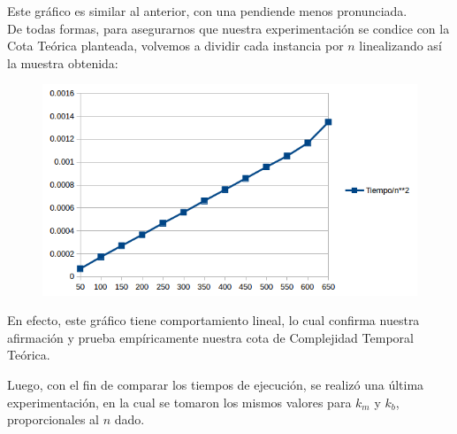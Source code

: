       \newpage
  
  Este gr\'afico es similar al anterior, con una pendiende menos pronunciada.\\
  
  De todas formas, para asegurarnos que nuestra experimentaci\'on se condice con la Cota Te\'orica planteada, volvemos a dividir cada instancia por $n$ linealizando as\'i la muestra obtenida:\\
  
    \begin{figure}[h!]
   \begin{center}
	\includegraphics[scale=0.8]{imagenes/ej1/peorCaso3.png}
   \end{center}
  \end{figure}
  
  En efecto, este gr\'afico tiene comportamiento lineal, lo cual confirma nuestra afirmaci\'on y prueba emp\'iricamente nuestra cota de Complejidad Temporal Te\'orica.
    
  Luego, con el fin de comparar los tiempos de ejecuci\'on, se realiz\'o una \'ultima experimentaci\'on, en la cual se tomaron los mismos valores para $k_m$ y $k_b$, proporcionales al $n$ dado.\\  
  
